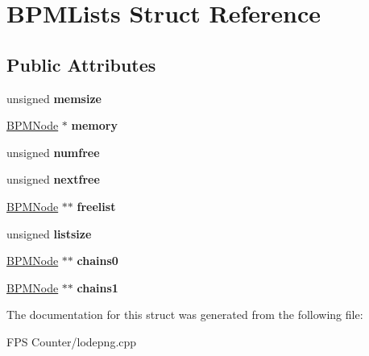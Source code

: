 \hypertarget{struct_b_p_m_lists}{}\section{B\+P\+M\+Lists Struct Reference}
\label{struct_b_p_m_lists}
\subsection*{Public Attributes}
\begin{DoxyCompactItemize}
\item 
\mbox{\label{struct_b_p_m_lists_a90fa629515809c2d29f13cf1829758fe}} 
unsigned {\bfseries memsize}
\item 
\mbox{\label{struct_b_p_m_lists_a97ededef0c47fc1911d0e56cf4c8458b}} 
\mbox{\hyperlink{struct_b_p_m_node}{B\+P\+M\+Node}} $\ast$ {\bfseries memory}
\item 
\mbox{\label{struct_b_p_m_lists_a3d91f7f393d455c28f0172557d050544}} 
unsigned {\bfseries numfree}
\item 
\mbox{\label{struct_b_p_m_lists_a2b4910e1d17b09862e8455fe37f733d9}} 
unsigned {\bfseries nextfree}
\item 
\mbox{\label{struct_b_p_m_lists_a60b8d594291b80d962e9bfedbe90f372}} 
\mbox{\hyperlink{struct_b_p_m_node}{B\+P\+M\+Node}} $\ast$$\ast$ {\bfseries freelist}
\item 
\mbox{\label{struct_b_p_m_lists_a3a41279ef589f0365c33d42b044f4864}} 
unsigned {\bfseries listsize}
\item 
\mbox{\label{struct_b_p_m_lists_ab4a37471c907b02976a672895d7c9ced}} 
\mbox{\hyperlink{struct_b_p_m_node}{B\+P\+M\+Node}} $\ast$$\ast$ {\bfseries chains0}
\item 
\mbox{\label{struct_b_p_m_lists_a4bd270f4f3d5df206be5a281593f5f76}} 
\mbox{\hyperlink{struct_b_p_m_node}{B\+P\+M\+Node}} $\ast$$\ast$ {\bfseries chains1}
\end{DoxyCompactItemize}


The documentation for this struct was generated from the following file\+:\begin{DoxyCompactItemize}
\item 
F\+P\+S Counter/lodepng.\+cpp\end{DoxyCompactItemize}

